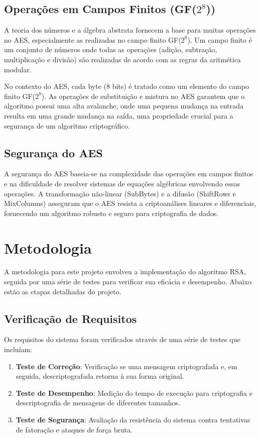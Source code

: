 \documentclass[a4paper,12pt]{article}
\begin{document}
\subsection*{Operações em Campos Finitos (GF($2^8$))}

A teoria dos números e a álgebra abstrata fornecem a base para muitas operações no AES, especialmente as realizadas no campo finito GF($2^8$). Um campo finito é um conjunto de números onde todas as operações (adição, subtração, multiplicação e divisão) são realizadas de acordo com as regras da aritmética modular.

No contexto do AES, cada byte (8 bits) é tratado como um elemento do campo finito GF($2^8$). As operações de substituição e mistura no AES garantem que o algoritmo possui uma alta avalanche, onde uma pequena mudança na entrada resulta em uma grande mudança na saída, uma propriedade crucial para a segurança de um algoritmo criptográfico.

\subsection*{Segurança do AES}

A segurança do AES baseia-se na complexidade das operações em campos finitos e na dificuldade de resolver sistemas de equações algébricas envolvendo essas operações. A transformação não-linear (SubBytes) e a difusão (ShiftRows e MixColumns) asseguram que o AES resista a criptoanálises lineares e diferenciais, fornecendo um algoritmo robusto e seguro para criptografia de dados.

\section*{Metodologia}
A metodologia para este projeto envolveu a implementação do algoritmo RSA, seguida por uma série de testes para verificar sua eficácia e desempenho. Abaixo estão as etapas detalhadas do projeto.

\subsection*{Verificação de Requisitos}
Os requisitos do sistema foram verificados através de uma série de testes que incluíam:

\begin{enumerate}
    \item \textbf{Teste de Correção}: Verificação se uma mensagem criptografada e, em seguida, descriptografada retorna à sua forma original.
    \item \textbf{Teste de Desempenho}: Medição do tempo de execução para criptografia e descriptografia de mensagens de diferentes tamanhos.
    \item \textbf{Teste de Segurança}: Avaliação da resistência do sistema contra tentativas de fatoração e ataques de força bruta.
\end{enumerate}
\end{document}
